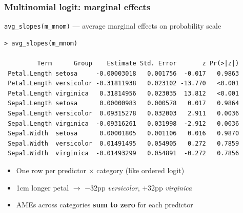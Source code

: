 \begin{frame}[fragile]
\frametitle{Multinomial logit: marginal effects}
\centering

\vspace{2pt}
{\scriptsize\texttt{avg\_slopes(m\_mnom)} --- average marginal effects on probability scale}

\vspace{4pt}

{\fontsize{4.5pt}{5.5pt}\selectfont
\begin{verbatim}
> avg_slopes(m_mnom)

         Term      Group    Estimate Std. Error       z Pr(>|z|)
 Petal.Length setosa     -0.00003018   0.001756  -0.017   0.9863
 Petal.Length versicolor -0.31811938   0.023102 -13.770   <0.001
 Petal.Length virginica   0.31814956   0.023035  13.812   <0.001
 Sepal.Length setosa      0.00000983   0.000578   0.017   0.9864
 Sepal.Length versicolor  0.09315278   0.032003   2.911   0.0036
 Sepal.Length virginica  -0.09316261   0.031998  -2.912   0.0036
 Sepal.Width  setosa      0.00001805   0.001106   0.016   0.9870
 Sepal.Width  versicolor  0.01491495   0.054905   0.272   0.7859
 Sepal.Width  virginica  -0.01493299   0.054891  -0.272   0.7856
\end{verbatim}
}

\vspace{4pt}

\begin{itemize}
\item {\small One row per predictor $\times$ category (like ordered logit)}
\item {\small 1cm longer petal $\to$ $-$32pp \textit{versicolor}, +32pp \textit{virginica}}
\item {\small AMEs across categories \textbf{sum to zero} for each predictor}
\end{itemize}

\end{frame}

